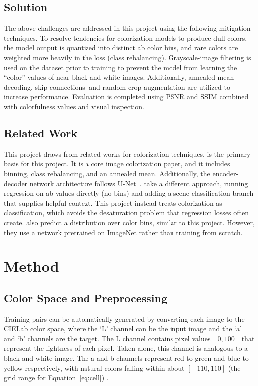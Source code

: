 \documentclass{article}
\begin{document}
\subsection{Solution}
The above challenges are addressed in this project using the following mitigation techniques. To resolve tendencies for colorization models to produce dull colors, the model output is quantized into distinct ab color bins, and rare colors are weighted more heavily in the loss (class rebalancing). Grayscale-image filtering is used on the dataset prior to training to prevent the model from learning the ``color'' values of near black and white images. Additionally, annealed-mean decoding, skip connections, and random-crop augmentation are utilized to increase performance. Evaluation is completed using PSNR and SSIM combined with colorfulness values and visual inspection.

\subsection{Related Work}

This project draws from related works for colorization techniques. \citet{zhang2016colorful} is the primary basis for this project. It is a core image colorization paper, and it includes binning, class rebalancing, and an annealed mean. Additionally, the encoder-decoder network architecture follows U-Net~\citep{ronneberger2015unet}. \citet{iizuka2016color} take a different approach, running regression on ab values directly (no bins) and adding a scene-classification branch that supplies helpful context. This project instead treats colorization as classification, which avoids the desaturation problem that regression losses often create. \citet{larsson2016learning} also predict a distribution over color bins, similar to this project. However, they use a network pretrained on ImageNet rather than training from scratch.

\section{Method}

\subsection{Color Space and Preprocessing}
Training pairs can be automatically generated by converting each image to the CIELab color space, where the ‘L’ channel can be the input image and the ‘a’ and ‘b’ channels are the target. The L channel contains pixel values $[0, 100]$ that represent the lightness of each pixel. Taken alone, this channel is analogous to a black and white image. The a and b channels represent red to green and blue to yellow respectively, with natural colors falling within about $[-110, 110]$ (the grid range for Equation~\ref{eq:cell}) \citep{cie2004colorimetry}.
\end{document}

